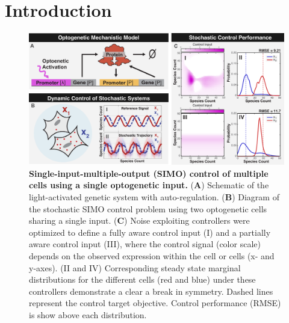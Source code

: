 \documentclass[12pt]{iopart}
\begin{document}
\section{Introduction}
\begin{figure}
\begin{center}
\includegraphics[width=\columnwidth]{Cartoons.pdf}
\caption{{\bf Single-input-multiple-output (SIMO) control of multiple cells using a single optogenetic input.}
({\bf A}) Schematic of the light-activated genetic system with auto-regulation.
({\bf B}) Diagram of the stochastic SIMO control problem using two optogenetic cells sharing a single input.
({\bf C}) Noise exploiting controllers were optimized to define a fully aware control input (I) and a partially aware control input (III), where the control signal (color scale) depends on the observed expression within the cell or cells (x- and y-axes).  (II and IV) Corresponding steady state marginal distributions for the different cells (red and blue) under these controllers demonstrate a clear a break in symmetry. Dashed lines represent the control target objective. Control performance (RMSE) is show above each distribution.}
\label{cartoons}
\end{center}
\vspace{-0.3in}
\end{figure}
\end{document}
